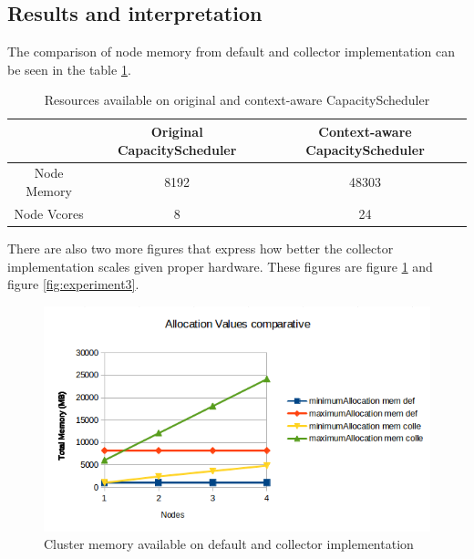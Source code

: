 \subsection{Results and interpretation}
The comparison of node memory from default and collector implementation can be seen in the table \ref{tab:experiments}.

\begin{table}
\renewcommand{\figurename}{Table}
\centering
\begin{tabular}{|c|c|c|}
\hline 
  & Original CapacityScheduler & Context-aware CapacityScheduler \\ 
\hline 
Node Memory & 8192 & 48303 \\ 
\hline 
Node Vcores & 8 & 24 \\ 
\hline 
\end{tabular}
\caption{Resources available on original and context-aware CapacityScheduler}
\label{tab:experiments}
\end{table}

There are also two more figures that express how better the collector implementation scales given proper hardware. These figures are figure \ref{fig:experiment2} and figure \ref{fig:experiment3}.

\begin{figure}[!hbtn]
   \renewcommand{\figurename}{Figure}
   \centering
   \includegraphics[width=15cm]{figuras/Figura10-totalMemory.png}
   \caption{Cluster memory available on default and collector implementation}
   \label{fig:experiment2}
\end{figure}

